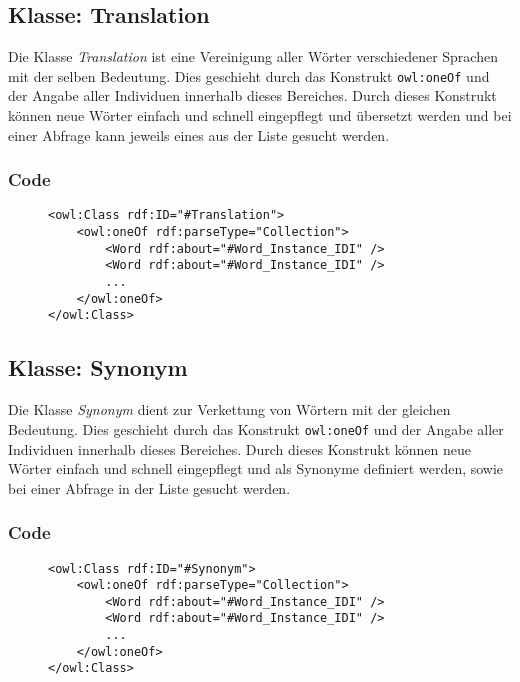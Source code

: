 \documentclass[
    11pt,
    latin1,
    a4paper,
    oneside
]{scrreprt}
\begin{document}
\subsection{Klasse: Translation} \label{sec:class_translation}

Die Klasse \emph{Translation} ist eine Vereinigung aller W\"orter verschiedener Sprachen mit der selben Bedeutung. Dies geschieht durch das Konstrukt \texttt{owl:oneOf} und der Angabe aller Individuen innerhalb dieses Bereiches. Durch dieses Konstrukt k\"onnen neue W\"orter einfach und schnell eingepflegt und \"ubersetzt werden und bei einer Abfrage kann jeweils eines aus der Liste gesucht werden.

\subsubsection{Code}  \label{sec:class_translation_code}

\begin{figure}[h]
 \lstset{language=XML}
 \begin{lstlisting}[label=owl:word]
<owl:Class rdf:ID="#Translation">
	<owl:oneOf rdf:parseType="Collection">
		<Word rdf:about="#Word_Instance_IDI" />
		<Word rdf:about="#Word_Instance_IDI" />
		...
	</owl:oneOf>
</owl:Class>
 \end{lstlisting}
\end{figure}

\subsection{Klasse: Synonym} \label{sec:class_synonym}

Die Klasse \emph{Synonym} dient zur Verkettung von W\"ortern mit der gleichen Bedeutung. Dies geschieht durch das Konstrukt \texttt{owl:oneOf} und der Angabe aller Individuen innerhalb dieses Bereiches. Durch dieses Konstrukt k\"onnen neue W\"orter einfach und schnell eingepflegt und als Synonyme definiert werden, sowie bei einer Abfrage in der Liste gesucht werden.


\subsubsection{Code}  \label{sec:class_synonym_code}

\begin{figure}[h]
 \lstset{language=XML}
 \begin{lstlisting}[label=owl:word]
<owl:Class rdf:ID="#Synonym">
	<owl:oneOf rdf:parseType="Collection">
		<Word rdf:about="#Word_Instance_IDI" />
		<Word rdf:about="#Word_Instance_IDI" />
		...
	</owl:oneOf>
</owl:Class>
 \end{lstlisting}
\end{figure}
\end{document}
